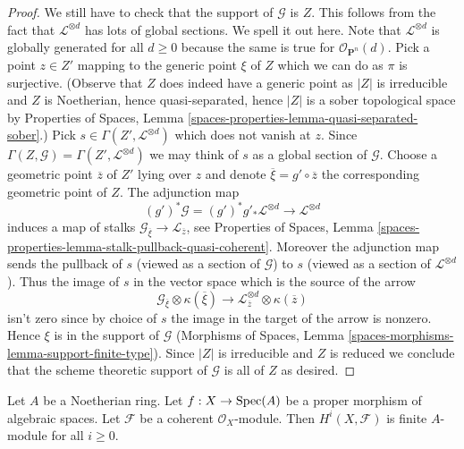 \begin{proof}
\medskip\noindent
We still have to check that the support of $\mathcal{G}$ is $Z$.
This follows from the fact that $\mathcal{L}^{\otimes d}$ has
lots of global sections. We spell it out here.
Note that $\mathcal{L}^{\otimes d}$ is globally generated for all $d \geq 0$
because the same is true for $\mathcal{O}_{\mathbf{P}^n}(d)$.
Pick a point $z \in Z'$ mapping to the generic point $\xi$ of $Z$
which we can do as $\pi$ is surjective.
(Observe that $Z$ does indeed have a generic point as $|Z|$ is irreducible
and $Z$ is Noetherian, hence quasi-separated, hence $|Z|$ is a sober
topological space by
Properties of Spaces, Lemma
\ref{spaces-properties-lemma-quasi-separated-sober}.)
Pick $s \in \Gamma(Z', \mathcal{L}^{\otimes d})$ which does not vanish at $z$.
Since $\Gamma(Z, \mathcal{G}) = \Gamma(Z', \mathcal{L}^{\otimes d})$
we may think of $s$ as a global section of $\mathcal{G}$.
Choose a geometric point $\overline{z}$ of $Z'$ lying over $z$
and denote $\overline{\xi} = g' \circ \overline{z}$
the corresponding geometric point of $Z$. The adjunction map
$$
(g')^*\mathcal{G} =
(g')^*g'_*\mathcal{L}^{\otimes d} \longrightarrow \mathcal{L}^{\otimes d}
$$
induces a map of stalks
$\mathcal{G}_{\overline{\xi}} \to \mathcal{L}_{\overline{z}}$, see
Properties of Spaces, Lemma
\ref{spaces-properties-lemma-stalk-pullback-quasi-coherent}.
Moreover the adjunction map sends the pullback of $s$ (viewed as a section
of $\mathcal{G}$) to $s$ (viewed as a section of $\mathcal{L}^{\otimes d}$).
Thus the image of $s$ in the vector space which is the source of the arrow
$$
\mathcal{G}_{\overline{\xi}} \otimes \kappa(\overline{\xi})
\longrightarrow
\mathcal{L}^{\otimes d}_{\overline{z}} \otimes \kappa(\overline{z})
$$
isn't zero since by choice of $s$ the image in the target of the arrow
is nonzero. Hence $\xi$ is in the support of $\mathcal{G}$
(Morphisms of Spaces, Lemma \ref{spaces-morphisms-lemma-support-finite-type}).
Since $|Z|$ is irreducible and $Z$ is reduced we conclude that
the scheme theoretic support of $\mathcal{G}$ is all of $Z$ as desired.
\end{proof}

\begin{lemma}
\label{lemma-proper-over-affine-cohomology-finite}
Let $A$ be a Noetherian ring.
Let $f : X \to \mathop{\mathrm{Spec}}(A)$ be a proper morphism of algebraic spaces.
Let $\mathcal{F}$ be a coherent $\mathcal{O}_X$-module.
Then $H^i(X, \mathcal{F})$ is finite $A$-module for all $i \geq 0$.
\end{lemma}

